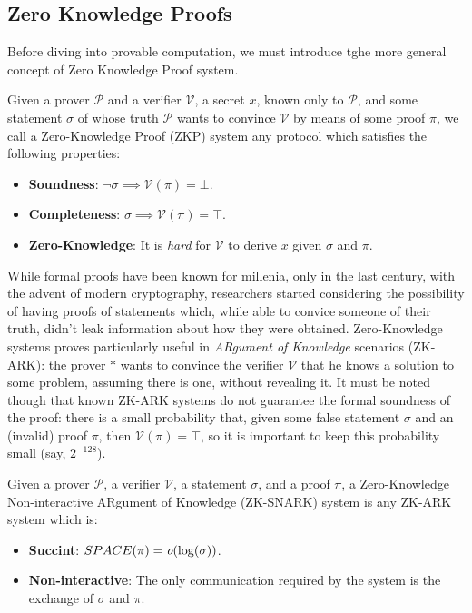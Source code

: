 \subsection{Zero Knowledge Proofs}
Before diving into provable computation, we must introduce tghe more general concept of Zero
Knowledge Proof system.
\begin{definition}
	Given a prover \(\mathcal{P}\) and a verifier \(\mathcal{V}\), a secret \(x\), known only to
	\(\mathcal{P}\), and some statement \(\sigma \) of whose truth \(\mathcal{P}\) wants to convince
	\(\mathcal{V}\) by means of some proof \(\pi \), we call a Zero-Knowledge Proof (ZKP) system any
	protocol which satisfies the following properties:
	\begin{itemize}
		\item \textbf{Soundness}: \(\neg{\sigma} \implies \mathcal{V}(\pi) = \bot \).
		\item \textbf{Completeness}: \(\sigma \implies \mathcal{V}(\pi) = \top \).
		\item \textbf{Zero-Knowledge}: It is \emph{hard} for \(\mathcal{V}\) to derive \(x\) given
		      \(\sigma \) and \(\pi \).
	\end{itemize}
\end{definition}

\noindent While formal proofs have been known for millenia, only in the last century, with the
advent of modern cryptography, researchers started considering the possibility of having proofs
of statements which, while able to convice someone of their truth, didn't leak information
about how they were obtained.
Zero-Knowledge systems proves particularly useful in \emph{ARgument of Knowledge} scenarios
(ZK-ARK): the prover \(*\) wants to convince the verifier \(\mathcal{V}\) that he
knows a solution to some problem, assuming there is one, without revealing it.
It must be noted though that known ZK-ARK systems do not guarantee the formal soundness of
the proof: there is a small probability that, given some false statement \(\sigma \) and an
(invalid) proof \(\pi \), then \(\mathcal{V}(\pi) = \top \), so it is important to keep this probability
small (say, \(2^{-128}\)).
\begin{definition}[ZK-SNARK]
	Given a prover \(\mathcal{P}\), a verifier \(\mathcal{V}\), a statement \(\sigma \), and a proof 
	\(\pi \), a Zero-Knowledge Non-interactive ARgument of Knowledge (ZK-SNARK) system is any 
	ZK-ARK system which is:
	\begin{itemize}
		\item \textbf{Succint}: \(SPACE(\pi) = \textit{o}(\log(\sigma))\).
		\item \textbf{Non-interactive}: The only communication required by the system is the exchange
		      of \(\sigma \) and \(\pi \).
	\end{itemize}
\end{definition}

